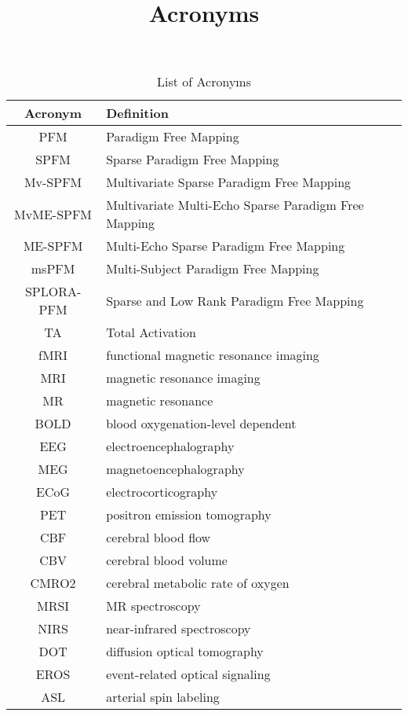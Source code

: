 \title{Acronyms}

\begin{table}[h]
    \centering
    \caption{List of Acronyms}
    \begin{tabular}{|c|p{}|}
    \hline
    \textbf{Acronym} & \textbf{Definition} \\
    \hline
    PFM & Paradigm Free Mapping \\
    \hline
    SPFM & Sparse Paradigm Free Mapping \\
    \hline
    Mv-SPFM & Multivariate Sparse Paradigm Free Mapping \\
    \hline
    MvME-SPFM & Multivariate Multi-Echo Sparse Paradigm Free Mapping \\
    \hline
    ME-SPFM & Multi-Echo Sparse Paradigm Free Mapping \\
    \hline
    msPFM & Multi-Subject Paradigm Free Mapping \\
    \hline
    SPLORA-PFM & Sparse and Low Rank Paradigm Free Mapping \\
    \hline
    TA & Total Activation \\
    \hline
    fMRI & functional magnetic resonance imaging \\
    \hline
    MRI & magnetic resonance imaging \\
    \hline
    MR & magnetic resonance \\
    \hline
    BOLD & blood oxygenation-level dependent \\
    \hline
    EEG & electroencephalography \\
    \hline
    MEG & magnetoencephalography \\
    \hline
    ECoG & electrocorticography \\
    \hline
    PET & positron emission tomography \\
    \hline
    CBF & cerebral blood flow \\
    \hline
    CBV & cerebral blood volume \\
    \hline
    CMRO2 & cerebral metabolic rate of oxygen \\
    \hline
    MRSI & MR spectroscopy \\
    \hline
    NIRS & near-infrared spectroscopy \\
    \hline
    DOT & diffusion optical tomography \\
    \hline
    EROS & event-related optical signaling \\
    \hline
    ASL & arterial spin labeling \\

\end{tabular}
\end{table}
